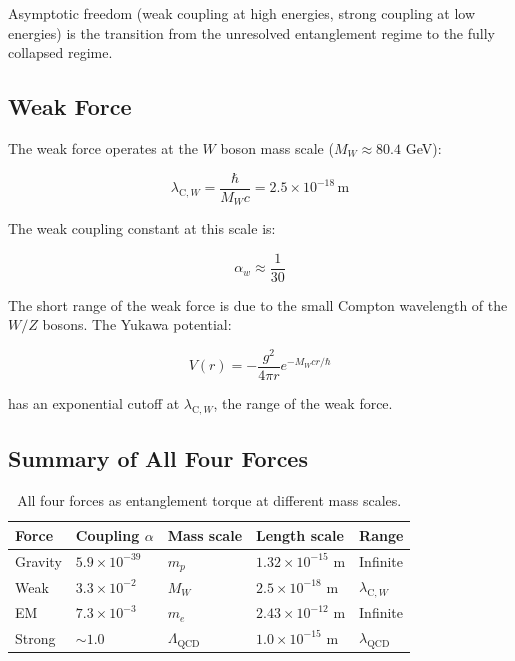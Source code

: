 \documentclass[11pt,letterpaper]{article}
\newcommand{\lambdacw}{\lambda_{\mathrm{C},W}}
\begin{document}
Asymptotic freedom (weak coupling at high energies, strong coupling at low energies) is the transition from the unresolved entanglement regime to the fully collapsed regime.

\subsection{Weak Force}

The weak force operates at the $W$ boson mass scale ($M_W \approx 80.4$ GeV):

\begin{equation}
  \lambdacw = \frac{\hbar}{M_W c} = 2.5 \times 10^{-18}\,\mathrm{m}
  \label{eq:w_compton}
\end{equation}

The weak coupling constant at this scale is:

\begin{equation}
  \alpha_w \approx \frac{1}{30}
  \label{eq:alpha_w}
\end{equation}

The short range of the weak force is due to the small Compton wavelength of the $W/Z$ bosons. The Yukawa potential:

\begin{equation}
  V(r) = -\frac{g^2}{4\pi r} e^{-M_W c r/\hbar}
  \label{eq:yukawa}
\end{equation}

has an exponential cutoff at $\lambdacw$, the range of the weak force.

\subsection{Summary of All Four Forces}

\begin{table}[H]
  \centering
  \caption{All four forces as entanglement torque at different mass scales.}
  \label{tab:four_forces}
  \begin{tabular}{lllll}
    \toprule
    Force & Coupling $\alpha$ & Mass scale & Length scale & Range \\
    \midrule
    Gravity & $5.9 \times 10^{-39}$ & $m_p$ & $1.32 \times 10^{-15}$ m & Infinite \\
    Weak & $3.3 \times 10^{-2}$ & $M_W$ & $2.5 \times 10^{-18}$ m & $\lambdacw$ \\
    EM & $7.3 \times 10^{-3}$ & $m_e$ & $2.43 \times 10^{-12}$ m & Infinite \\
    Strong & $\sim 1.0$ & $\Lambda_{\mathrm{QCD}}$ & $1.0 \times 10^{-15}$ m & $\lambda_{\mathrm{QCD}}$ \\
    \bottomrule
  \end{tabular}
\end{table}
\end{document}
